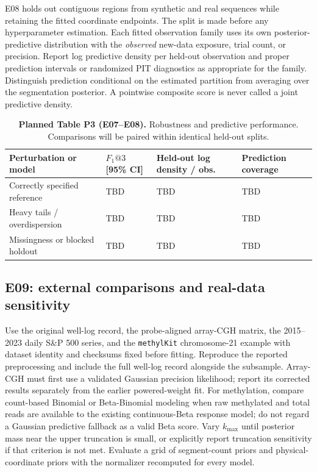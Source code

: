 E08 holds out contiguous regions from synthetic and real sequences while
retaining the fitted coordinate endpoints. The split is made before any
hyperparameter estimation. Each fitted observation family uses its own
posterior-predictive distribution with the \emph{observed} new-data exposure,
trial count, or precision. Report log predictive density per held-out
observation and proper prediction intervals or randomized PIT diagnostics as
appropriate for the family. Distinguish prediction conditional on the
estimated partition from averaging over the segmentation posterior. A
pointwise composite score is never called a joint predictive density.

\begin{table}[!htbp]
\centering\small
\caption{\textbf{Planned Table P3 (E07--E08).} Robustness and predictive
performance. Comparisons will be paired within identical held-out splits.}
\label{tab:planned-robustness-paper}
\begin{tabularx}{0.94\textwidth}{@{}L{0.34\textwidth}L{0.22\textwidth}L{0.20\textwidth}Y@{}}
\toprule
Perturbation or model & $F_1@3$ [95\% CI] & Held-out log density / obs. & Prediction coverage \\
\midrule
Correctly specified reference & TBD & TBD & TBD \\
Heavy tails / overdispersion & TBD & TBD & TBD \\
Missingness or blocked holdout & TBD & TBD & TBD \\
\bottomrule
\end{tabularx}
\end{table}

\subsection{E09: external comparisons and real-data sensitivity}
Use the original well-log record, the probe-aligned array-CGH matrix, the
2015--2023 daily S\&P 500 series, and the \texttt{methylKit} chromosome-21
example with dataset identity and checksums fixed before fitting. Reproduce
the reported preprocessing and include the full well-log record alongside the
subsample. Array-CGH must first use a validated Gaussian precision likelihood;
report its corrected results separately from the earlier powered-weight fit.
For methylation, compare count-based Binomial or Beta-Binomial modeling when
raw methylated and total reads are available to the existing continuous-Beta
response model; do not regard a Gaussian predictive fallback as a valid Beta
score. Vary $k_{\max}$ until posterior mass near the upper truncation is
small, or explicitly report truncation sensitivity if that criterion is not
met. Evaluate a grid of segment-count priors and physical-coordinate priors
with the normalizer recomputed for every model.

